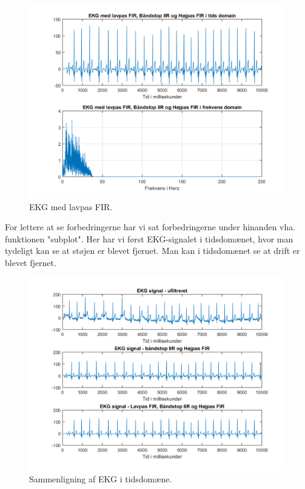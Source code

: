 \documentclass[12pt, letterpaper]{article}
\begin{document}
\begin{figure}[H]
           \includegraphics[width=\linewidth]{billeder/lavpasFIRBandstopIIRogHojpasFIR}	   							\caption{EKG med lavpas FIR.}
\end{figure}



For lettere at se forbedringerne har vi sat forbedringerne under hinanden vha. funktionen "subplot". Her har vi først EKG-signalet i tidsdomænet, hvor man tydeligt kan se at støjen er blevet fjernet. 
Man kan i tidsdomænet se at drift er blevet fjernet. 

\begin{figure}[H]
           \includegraphics[width=\linewidth]{billeder/EKGtidsdomain}	   							\caption{Sammenligning af EKG i tidsdomæne.}
\end{figure}
\end{document}

